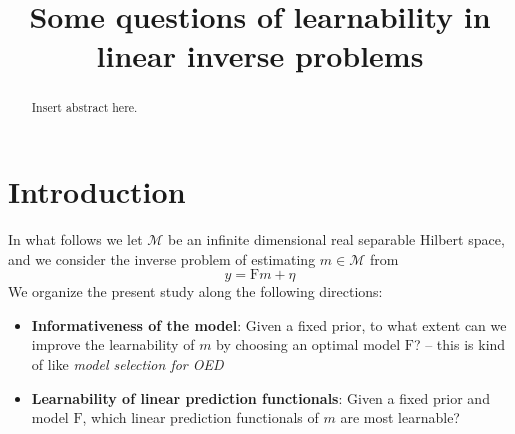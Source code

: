 \documentclass[ba]{imsart}
\theoremstyle{plain}
\newcommand{\F}{\mathrm{F}}
\newcommand{\M}{\mathcal{M}}
\begin{document}
\begin{frontmatter}
\title{Some questions of learnability in linear inverse problems}



\begin{abstract}
Insert abstract here.
\end{abstract}


\begin{keyword}[class=MSC]
\end{keyword}

\begin{keyword}
\end{keyword}

\end{frontmatter}

\section{Introduction}
In what follows we let $\M$ be an infinite dimensional real separable Hilbert space, and we
consider the inverse problem of estimating $m \in \M$ from 
\begin{equation}\label{equ:model}
y = \F m + \eta
\end{equation}
We organize the present study along the following directions:
\begin{itemize}
\item \textbf{Informativeness of the model}: 
Given a fixed prior, to what extent can we improve the learnability of $m$ by 
choosing an optimal model $\F$? -- this is kind of like {\em model selection for OED}

\item \textbf{Learnability of linear prediction functionals}:
Given 
a fixed prior and model $\F$, which linear prediction functionals of $m$ 
are most learnable? 
\end{itemize}
\end{document}
